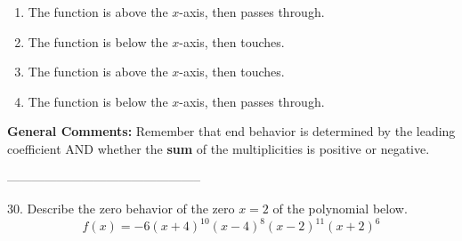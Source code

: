 \documentclass{extbook}[14pt]
\begin{document}
\begin{enumerate}[label=\Alph*.] 
\item The function is above the $x$-axis, then passes through.  
\item The function is below the $x$-axis, then touches.  
\item The function is above the $x$-axis, then touches.  
\item The function is below the $x$-axis, then passes through.  
\end{enumerate} 
 
\textbf{General Comments:} Remember that end behavior is determined by the leading coefficient AND whether the \textbf{sum} of the multiplicities is positive or negative.

-----------------------------------------------

30. Describe the zero behavior of the zero $x = 2$ of the polynomial below.
\[ f(x) = -6(x + 4)^{10}(x - 4)^{8}(x - 2)^{11}(x + 2)^{6} \] 
\end{document}
